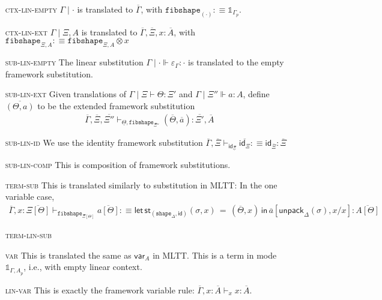 \documentclass[10pt]{article}
\theoremstyle{definition}
\newcommand{\yields}{\vdash}
\newcommand{\id}{\mathsf{id}}
\newcommand\StI[2]{\ensuremath{\mathsf{st}_{#1}(#2)}}
\newcommand\StE[4]{\ensuremath{\mathsf{let} \, \StI{#1}{#3} \, = \, {#2} \, \mathsf{in} \, #4}}
\newcommand\unpack[2]{\ensuremath{\mathsf{unpack}_{#1}(#2)}}
\newcommand{\modeof}[1]{{#1}_p}
\newcommand{\tshape}[1]{\ensuremath{\mathtt{shape}_{#1}}}
\newcommand{\qyields}{\Vdash}
\newcommand{\upstairs}[1]{\overline{#1}}
\newcommand{\downstairs}[1]{\underline{#1}}
\newcommand\qvar[1]{\ensuremath{\mathsf{var}_{#1}}}
\newcommand\One{\ensuremath{\mathds{1}}}
\newcommand{\tfibshape}[1]{\ensuremath{\mathtt{fibshape}_{#1}}}
\begin{document}
\begin{enumerate}
\item[\textsc{ctx-lin-empty}] $\Gamma \mid \cdot$ is translated to $\upstairs{\Gamma}$, with $\tfibshape{(\cdot)} :\equiv \One_{\modeof{\Gamma}}$.
\item[\textsc{ctx-lin-ext}] $\Gamma \mid \Xi, A$ is translated to $\upstairs{\Gamma}, \upstairs{\Xi}, x : \upstairs{A}$, with $\tfibshape{\Xi, A} :\equiv \tfibshape{\Xi, A} \otimes x$
\item[\textsc{sub-lin-empty}]  The linear substitution $\Gamma \mid \cdot \qyields \varepsilon_{\Gamma} : \cdot$ is translated to the empty framework substitution.
\item[\textsc{sub-lin-ext}] Given translations of $\Gamma \mid \Xi \yields \Theta : \Xi'$ and $\Gamma \mid \Xi'' \qyields a : A$, define $\upstairs{(\Theta, a)}$ to be the extended framework substitution 
\begin{align*}
\upstairs{\Gamma}, \upstairs{\Xi}, \upstairs{\Xi''} \yields_{\downstairs{\Theta}, \tfibshape{\Xi''}} (\upstairs{\Theta}, \upstairs{a}) : \upstairs{\Xi'}, \upstairs{A}
\end{align*}
\item[\textsc{sub-lin-id}] We use the identity framework substitution $\upstairs{\Gamma}, \upstairs{\Xi} \yields_{\id_{\downstairs{\Xi}}} \upstairs{\id_\Xi} :\equiv \id_{\upstairs{\Xi}} : \upstairs{\Xi}$
\item[\textsc{sub-lin-comp}] This is composition of framework substitutions. 
\item[\textsc{term-sub}] This is translated similarly to substitution in MLTT:  In the one variable case, 
\begin{align*}
\upstairs{\Gamma}, x : \upstairs{\Xi[\Theta]} \yields_{\tfibshape{\Xi[\Theta]}} \upstairs{a[\Theta]} :\equiv \StE{(\tshape{\Delta}, \id)}{(\upstairs{\Theta}, x)}{\sigma, x}{\upstairs{a}[\unpack{\Delta}{\sigma}, x/x]} : \upstairs{A[\Theta]}
\end{align*}
\item[\textsc{term-lin-sub}] 
\item[\textsc{var}] This is translated the same as $\qvar{A}$ in MLTT. This is a term in mode $\One_{\modeof{\Gamma, A}}$, i.e., with empty linear context.
\item[\textsc{lin-var}] This is exactly the framework variable rule: $\upstairs{\Gamma}, x : \upstairs{A} \yields_x x : \upstairs{A}$.
\end{enumerate}
\end{document}
